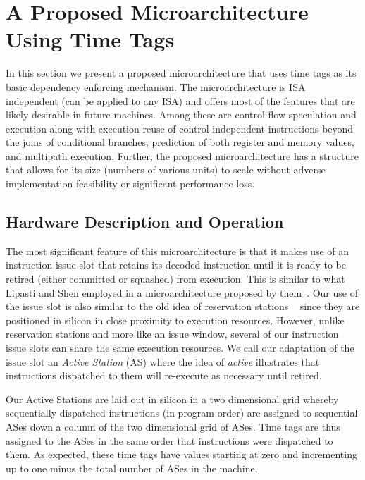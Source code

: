 \documentclass[10pt,twocolumn]{article}
\begin{document}
\section{A Proposed Microarchitecture Using Time Tags}
\vspace{-0.15in}
%
In this section we present a proposed microarchitecture
that uses time tags as its basic dependency enforcing mechanism.
The microarchitecture is ISA independent (can be applied to
any ISA) and offers most of the features that are likely desirable
in future machines.  Among these are control-flow speculation
and execution along with execution reuse of control-independent
instructions beyond the joins of conditional branches,
prediction of both register and memory values, and multipath execution.
Further, the proposed microarchitecture has a structure that allows
for its size (numbers of various units) to scale without adverse
implementation feasibility or significant performance loss.
%
%
\vspace{-0.25in}
\subsection{Hardware Description and Operation}
\vspace{-0.15in}
%
The most significant feature of this microarchitecture is
that it makes use of an instruction issue slot that retains
its decoded instruction until it is ready to be retired 
(either committed or squashed) from execution.
This is similar to what Lipasti and Shen employed in a microarchitecture
proposed by them~\cite{Lip97}.
Our use of the issue slot is also similar to the old idea
of reservation stations ~\cite{Tom67} since they are positioned
in silicon in close proximity to execution resources.  However,
unlike reservation stations and more like an issue window,
several of our instruction issue slots can share the same
execution resources.
We call our adaptation of the issue slot an 
{\em Active Station} (AS) where the idea of \textit{active}
illustrates that instructions dispatched to them will
re-execute as necessary until retired.  

Our Active Stations are laid out in silicon 
in a two dimensional grid whereby sequentially
dispatched instructions (in program order) are assigned to 
sequential ASes down a column of
the two dimensional grid of ASes.  
Time tags are thus assigned to the ASes in the same order
that instructions were dispatched to them.
As expected, these time tags have values starting at zero
and
incrementing up to one minus the total number of
ASes in the machine.
\end{document}
